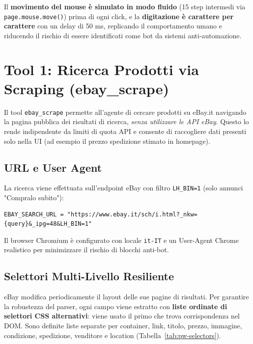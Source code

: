 Il \textbf{movimento del mouse è simulato in modo fluido} (15 step
intermedi via \texttt{page.mouse.move()}) prima di ogni click, e la
\textbf{digitazione è carattere per carattere} con un delay di 50 ms,
replicando il comportamento umano e riducendo il rischio di essere
identificati come bot da sistemi anti-automazione.


\section{Tool 1: Ricerca Prodotti via Scraping (ebay\_scrape)}
\label{sec:pw-scrape}

Il tool \texttt{ebay\_scrape} permette all'agente di cercare prodotti
su eBay.it navigando la pagina pubblica dei risultati di ricerca,
\emph{senza utilizzare le API eBay}. Questo lo rende indipendente da
limiti di quota API e consente di raccogliere dati presenti solo nella
UI (ad esempio il prezzo spedizione stimato in homepage).

\subsection{URL e User Agent}
\label{subsec:pw-scrape-url}

La ricerca viene effettuata sull'endpoint eBay con filtro
\texttt{LH\_BIN=1} (solo annunci "Compralo subito"):

\begin{verbatim}
EBAY_SEARCH_URL = "https://www.ebay.it/sch/i.html?_nkw={query}&_ipg=48&LH_BIN=1"
\end{verbatim}

Il browser Chromium è configurato con locale \texttt{it-IT} e un
User-Agent Chrome realistico per minimizzare il rischio di blocchi
anti-bot.

\subsection{Selettori Multi-Livello Resiliente}
\label{subsec:pw-scrape-selectors}

eBay modifica periodicamente il layout delle sue pagine di risultati.
Per garantire la robustezza del parser, ogni campo viene estratto
con \textbf{liste ordinate di selettori CSS alternativi}: viene usato
il primo che trova corrispondenza nel DOM. Sono definite liste separate
per container, link, titolo, prezzo, immagine, condizione, spedizione,
venditore e location (Tabella~\ref{tab:pw-selectors}).


